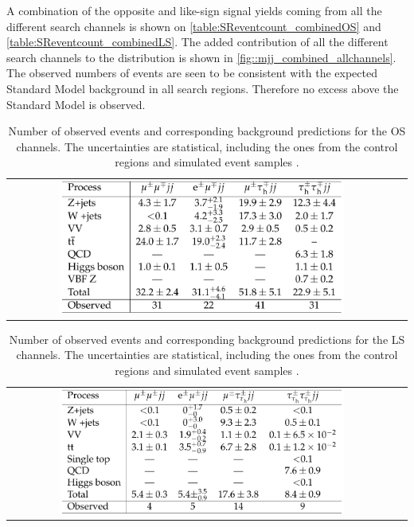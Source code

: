 A combination of the opposite and like-sign signal yields coming from all the different search channels is shown on \autoref{table:SReventcount_combinedOS} and \autoref{table:SReventcount_combinedLS}. The added contribution of all the different search channels to the \mjj distribution is shown in \autoref{fig::mjj_combined_allchannels}\cite{Khachatryan:2015kxa}. The observed numbers of events are seen to be consistent with the expected Standard Model background in all search regions. Therefore no excess above the Standard Model is observed.

\begin{table}[tbh!]
	\centering
	\begin{tabular}{cc}
		\includegraphics[width=0.75\textwidth]{PLOTS/CMS-SUS-14-005_Table_002.pdf}
	\end{tabular}
	\caption{Number of observed events and corresponding background predictions for the OS channels. The uncertainties are statistical, including the ones from the control regions and simulated event samples \cite{Khachatryan:2015kxa}.}
	\label{table:SReventcount_combinedOS}
\end{table} 

\begin{table}[tbh!]
	\centering
	\begin{tabular}{cc}
		\includegraphics[width=0.75\textwidth]{PLOTS/CMS-SUS-14-005_Table_003.pdf}
	\end{tabular}
	\caption{Number of observed events and corresponding background predictions for the LS channels. The uncertainties are statistical, including the ones from the control regions and simulated event samples \cite{Khachatryan:2015kxa}.}
	\label{table:SReventcount_combinedLS}
\end{table} 

